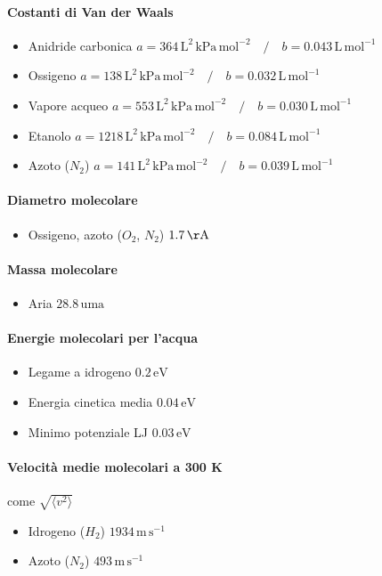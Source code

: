 \documentclass[10pt, oneside]{article}
\begin{document}
\paragraph{Costanti di Van der Waals}
\begin{itemize}
\item Anidride carbonica \dotfill $a = 364 \, \mathrm{L^2 \, kPa \, mol^{-2}} \quad \big/ \quad b = 0.043 \, \mathrm{L \, mol^{-1}}$ 
\item Ossigeno \dotfill $a = 138 \, \mathrm{L^2 \, kPa \, mol^{-2}} \quad \big/ \quad b = 0.032 \, \mathrm{L \, mol^{-1}}$ 
\item Vapore acqueo \dotfill $a = 553 \, \mathrm{L^2 \, kPa \, mol^{-2}} \quad \big/ \quad b = 0.030 \, \mathrm{L \, mol^{-1}}$ 
\item Etanolo \dotfill $a = 1218 \, \mathrm{L^2 \, kPa \, mol^{-2}} \quad \big/ \quad b = 0.084 \, \mathrm{L \, mol^{-1}}$ 
\item Azoto ($N_2$) \dotfill $a = 141 \, \mathrm{L^2 \, kPa \, mol^{-2}} \quad \big/ \quad b = 0.039 \, \mathrm{L \, mol^{-1}}$ 
\end{itemize}
\paragraph{Diametro molecolare}
\begin{itemize}
\item Ossigeno, azoto ($O_2$, $N_2$) \dotfill $ 1.7 \, \mathrm{\AA}$ 
\end{itemize}
\paragraph{Massa molecolare}
\begin{itemize}
\item Aria \dotfill $ 28.8 \, \mathrm{uma}$
\end{itemize}
\paragraph{Energie molecolari per l'acqua}
\begin{itemize}
\item Legame a idrogeno \dotfill $ 0.2 \, \mathrm{eV}$
\item Energia cinetica media \dotfill $ 0.04 \, \mathrm{eV}$
\item Minimo potenziale LJ \dotfill $ 0.03 \, \mathrm{eV}$

\end{itemize}
\paragraph{Velocità medie molecolari a 300 K} come $\displaystyle \sqrt{\langle v^2 \rangle}$
\begin{itemize}
\item Idrogeno ($H_2$) \dotfill $ 1934 \, \mathrm{m \, s^{-1}}$ 
\item Azoto ($N_2$) \dotfill $ 493 \, \mathrm{m \, s^{-1}}$ 
\end{itemize}
\end{document}
